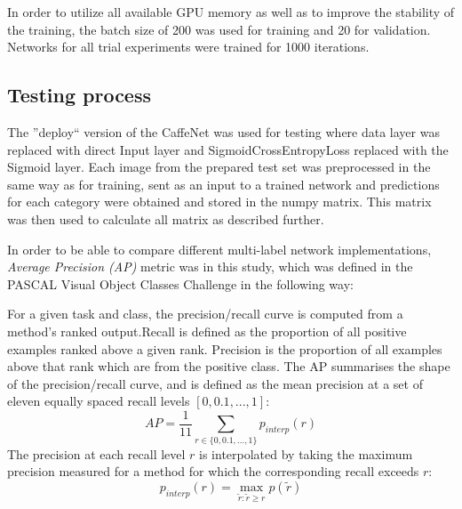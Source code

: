     In order to utilize all available GPU memory as well as to improve the stability of the training, the batch size of 200 was used for training and 20 for validation. Networks for all trial experiments were trained for 1000 iterations.
    
    
    
    
    \subsection{Testing process}
    \label{sec:trial-testing}
    The ''deploy`` version of the CaffeNet was used for testing where data layer was replaced with direct Input layer and SigmoidCrossEntropyLoss replaced with the Sigmoid layer. Each image from the prepared test set was preprocessed in the same way as for training, sent as an input to a trained network and predictions for each category were obtained and stored in the numpy matrix. This matrix was then used to calculate all matrix as described further.
    
    In order to be able to compare different multi-label network implementations, \textit{Average Precision (AP)} metric was in this study, which was defined in the PASCAL Visual Object Classes Challenge \cite{Everingham2010PASCAL-VOC} in the following way:
    
    \begin{displayquote}
    For a given task and class, the precision/recall curve is computed from a method’s ranked output.Recall is defined as the proportion of all positive examples ranked above a given rank. Precision is the proportion of all examples above that rank which are from the positive class. The AP summarises the shape of the precision/recall curve, and is defined as the mean precision at a set of eleven equally spaced recall levels $[0,0.1, . . . ,1]$:
    $$
    AP = \frac{1}{11} \sum_{r \in \{0, 0.1, ..., 1\}} p_{interp}(r)
    $$
    The precision at each recall level $r$ is interpolated by taking the maximum precision measured for a method for which the corresponding recall exceeds $r$:
    $$
    p_{interp}(r) = \max_{\tilde{r}:\tilde{r} \ge r} p(\tilde{r})
    $$
    \end{displayquote}
    
